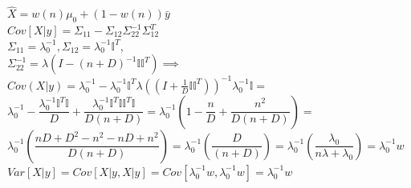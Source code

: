 \documentclass[18pt]{article}
\begin{document}
\begin{flushleft}
\vspace{.4cm}
$\hat{X}=w(n) \mu_0+(1-w(n))\bar{y}$\\
\vspace{.4cm}
$Cov[X|y]=\Sigma_{11}-\Sigma_{12}\Sigma_{22}^{-1}\Sigma_{12}^T$\\
\vspace{.4cm}
$\Sigma_{11}=\lambda_0^{-1},\Sigma_{12}=\lambda_0^{-1} \mathbb{I}^T$,\\
$\Sigma_{22}^{-1}=\lambda\left(I-(n+D)^{-1} \mathbb{I}\mathbb{I}^T\right) \implies$\\
\vspace{.4cm}
$Cov(X|y)=\lambda_0^{-1}-\lambda_0^{-1} \mathbb{I}^T \lambda\left((I+\frac{1}{D}\mathbb{I}\mathbb{I}^T)\right)^{-1}\lambda_0^{-1} \mathbb{I}=$
$\lambda_0^{-1}-\dfrac{\lambda_0^{-1} \mathbb{I}^T \mathbb{I}}{D}+ \dfrac{\lambda_0^{-1} \mathbb{I}^T \mathbb{I} \mathbb{I}^T \mathbb{I}}{D(n+D)}=\lambda_0^{-1}\left(1-\dfrac{n}{D}+\dfrac{n^2}{D(n+D)}\right)=$\\
$\lambda_0^{-1}\left(\dfrac{nD+D^2-n^2-nD+n^2}{D(n+D)}\right)=\lambda_0^{-1}\left(\dfrac{D}{(n+D)}\right)=\lambda_0^{-1}\left(\dfrac{\lambda_0}{n\lambda+\lambda_0}\right)=\lambda_0^{-1}w$\\
\vspace{.4cm}
$Var[X|y]=Cov[X|y,X|y]=Cov[\lambda_0^{-1}w,\lambda_0^{-1}w]=\lambda_0^{-1}w$\\



















\end{flushleft}
\end{document}
